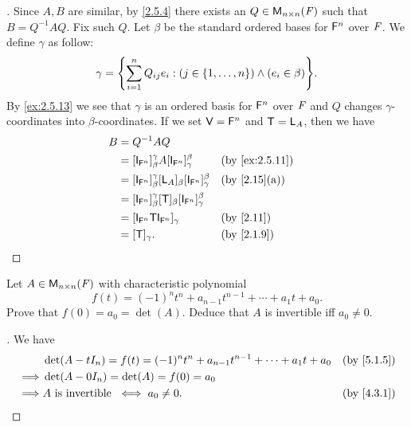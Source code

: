 \begin{proof}[]
  Since \(A, B\) are similar, by \cref{2.5.4} there exists an \(Q \in \mathsf{M}_{{n} \times n}({\mathit{F}})\) such that \(B = Q^{-1} A Q\).
  Fix such \(Q\).
  Let \(\beta\) be the standard ordered bases for \(\mathsf{F}^n\) over \(\mathit{F}\).
  We define \(\gamma\) as follow:
  \[
    \gamma = \set{\sum_{i = 1}^n Q_{i j} e_i : (j \in \set{1, \dots, n}) \land (e_i \in \beta)}.
  \]
  By \cref{ex:2.5.13} we see that \(\gamma\) is an ordered basis for \(\mathsf{F}^n\) over \(\mathit{F}\) and \(Q\) changes \(\gamma\)-coordinates into \(\beta\)-coordinates.
  If we set \(\mathsf{V} = \mathsf{F}^n\) and \(\mathsf{T} = \mathsf{L}_A\), then we have
  \begin{align*}
    B & = Q^{-1} A Q                                                                                                         \\
      & = [\IT[\vs{F}^n]]_{\beta}^{\gamma} A [\IT[\vs{F}^n]]_{\gamma}^{\beta}              &  & \text{(by \cref{ex:2.5.11})} \\
      & = [\IT[\vs{F}^n]]_{\beta}^{\gamma} [\L_A]_{\beta} [\IT[\vs{F}^n]]_{\gamma}^{\beta} &  & \text{(by \cref{2.15}(a))}   \\
      & = [\IT[\vs{F}^n]]_{\beta}^{\gamma} [\T]_{\beta} [\IT[\vs{F}^n]]_{\gamma}^{\beta}                                     \\
      & = [\IT[\vs{F}^n] \T \IT[\vs{F}^n]]_{\gamma}                                        &  & \text{(by \cref{2.11})}      \\
      & = [\T]_{\gamma}.                                                                   &  & \text{(by \cref{2.1.9})}
  \end{align*}
\end{proof}

\begin{ex}\label{ex:5.1.20}
  Let \(A \in \mathsf{M}_{{n} \times n}({\mathit{F}})\) with characteristic polynomial
  \[
    f(t) = (-1)^n t^n + a_{n - 1} t^{n - 1} + \cdots + a_1 t + a_0.
  \]
  Prove that \(f(0) = a_0 = \det(A)\).
  Deduce that \(A\) is invertible iff \(a_0 \neq 0\).
\end{ex}

\begin{proof}[]
  We have
  \begin{align*}
             & \det(A - t I_n) = f(t) = (-1)^n t^n + a_{n - 1} t^{n - 1} + \cdots + a_1 t + a_0 &  & \text{(by \cref{5.1.5})} \\
    \implies & \det(A - 0 I_n) = \det(A) = f(0) = a_0                                                                         \\
    \implies & A \text{ is invertible } \iff a_0 \neq 0.                                        &  & \text{(by \cref{4.3.1})}
  \end{align*}
\end{proof}

